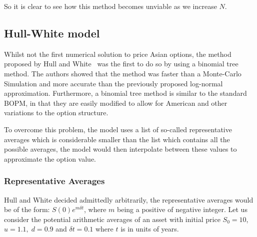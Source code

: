 So it is clear to see how this method becomes unviable as we increase \(N \).

\subsection{Hull-White model}

Whilst not the first numerical solution to price Asian options, the method proposed by Hull and White~\cite{Hull21} was the first to do so by using a binomial tree method. The authors showed that the method was faster than a Monte-Carlo Simulation and more accurate than the previously proposed log-normal approximation. Furthermore, a binomial tree method is similar to the standard BOPM, in that they are easily modified to allow for American and other variations to the option structure.

To overcome this problem, the model uses a list of so-called representative averages which is considerable smaller than the list which contains all the possible averages, the model would then interpolate between these values to approximate the option value. 

\subsubsection{Representative Averages}

Hull and White decided admittedly arbitrarily, the representative averages would be of the form: \(S(0)e^{m\delta t}\), where \(m \) being a positive of negative integer.
\nline{}
Let us consider the potential arithmetic averages of an asset with initial price \(S_0 = 10\),\(u = 1.1,\; d = 0.9\) and \(\delta t = 0.1\) where \(t \) is in units of years.


